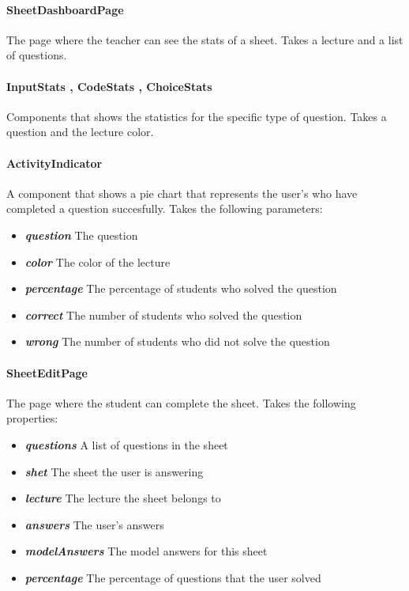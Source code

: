 \paragraph{SheetDashboardPage} The page where the teacher can see the stats of a sheet. Takes a lecture and a list of questions.
\paragraph{InputStats , CodeStats , ChoiceStats} Components that shows the statistics for the specific type of question. Takes a question and the lecture color.
\paragraph{ActivityIndicator} A component that shows a pie chart that represents the user's who have completed a question succesfully. Takes the following parameters:
\begin{itemize}
	\item \textit{\textbf{question}} The question
	\item \textit{\textbf{color}} The color of the lecture
	\item \textit{\textbf{percentage}} The percentage of students who solved the question
	\item \textit{\textbf{correct}} The number of students who solved the question
	\item \textit{\textbf{wrong}} The number of students who did not solve the question
\end{itemize}
\paragraph{SheetEditPage} The page where the student can complete the sheet. Takes the following properties:
\begin{itemize}
	\item \textit{\textbf{questions}} A list of questions in the sheet
	\item \textit{\textbf{shet}} The sheet the user is answering
	\item \textit{\textbf{lecture}} The lecture the sheet belongs to
	\item \textit{\textbf{answers}} The user's answers
	\item \textit{\textbf{modelAnswers}} The model answers for this sheet
	\item \textit{\textbf{percentage}} The percentage of questions that the user solved
\end{itemize}
